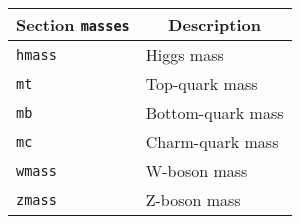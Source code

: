 	\begin{longtable}{p{1.5cm}p{12cm}}
		\toprule
		\multicolumn{1}{c}{{\textbf{Section} \texttt{masses}}} & \multicolumn{1}{c}{{\textbf{Description}}} \\ 
		\midrule
		\texttt{hmass} & Higgs mass \\
		\texttt{mt} & Top-quark mass \\
		\texttt{mb} & Bottom-quark mass \\
		\texttt{mc} & Charm-quark mass \\
		\texttt{wmass} & W-boson mass \\
		\texttt{zmass} & Z-boson mass \\
		\bottomrule
	\end{longtable}
